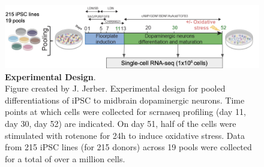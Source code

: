 \begin{figure}[h]
\centering
\includegraphics[width=15.5cm]{Chapter5/Fig/neuroseq_experimental_design.png}
\caption[Experimental Design]{\textbf{Experimental Design}.\\
Figure created by J. Jerber.
Experimental design for pooled differentiations of iPSC to midbrain dopaminergic neurons. 
Time points at which cells were collected for \gls{scrnaseq} profiling (day 11, day 30, day 52) are indicated. 
On day 51, half of the cells were stimulated with rotenone for 24h to induce oxidative stress.
Data from 215 iPSC lines (for 215 donors) across 19 pools were collected for a total of over a million cells.}
\label{fig:neuroseq_experimental_design}
\end{figure}






